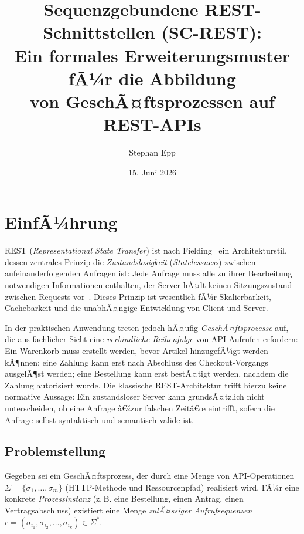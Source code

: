 ﻿\documentclass[a4paper,12pt]{article}
\title{Sequenzgebundene REST-Schnittstellen (SC-REST):\\
Ein formales Erweiterungsmuster fÃ¼r die Abbildung\\
von GeschÃ¤ftsprozessen auf REST-APIs}
\author{Stephan Epp}
\date{15. Juni 2026}
\theoremstyle{definition}
\begin{document}
\maketitle

\tableofcontents
\newpage

\section{EinfÃ¼hrung}

REST (\emph{Representational State Transfer}) ist nach Fielding~\cite{fielding2000} ein
Architekturstil, dessen zentrales Prinzip die \emph{Zustandslosigkeit} (\emph{Statelessness})
zwischen aufeinanderfolgenden Anfragen ist: Jede Anfrage muss alle zu ihrer Bearbeitung
notwendigen Informationen enthalten, der Server hÃ¤lt keinen Sitzungszustand zwischen
Requests vor~\cite{rfc7231}. Dieses Prinzip ist wesentlich fÃ¼r Skalierbarkeit, Cachebarkeit
und die unabhÃ¤ngige Entwicklung von Client und Server.

In der praktischen Anwendung treten jedoch hÃ¤ufig \emph{GeschÃ¤ftsprozesse} auf, die aus
fachlicher Sicht eine \emph{verbindliche Reihenfolge} von API-Aufrufen erfordern: Ein
Warenkorb muss erstellt werden, bevor Artikel hinzugefÃ¼gt werden kÃ¶nnen; eine Zahlung kann
erst nach Abschluss des Checkout-Vorgangs ausgelÃ¶st werden; eine Bestellung kann erst
bestÃ¤tigt werden, nachdem die Zahlung autorisiert wurde. Die klassische REST-Architektur
trifft hierzu keine normative Aussage: Ein zustandsloser Server kann grundsÃ¤tzlich nicht
unterscheiden, ob eine Anfrage â€žzur falschen Zeitâ€œ eintrifft, sofern die Anfrage selbst
syntaktisch und semantisch valide ist.

\subsection{Problemstellung}

Gegeben sei ein GeschÃ¤ftsprozess, der durch eine Menge von API-Operationen
$\Sigma = \{\sigma_1, \ldots, \sigma_m\}$ (HTTP-Methode und Ressourcenpfad) realisiert wird.
FÃ¼r eine konkrete \emph{Prozessinstanz} (z.\,B. eine Bestellung, einen Antrag, einen
Vertragsabschluss) existiert eine Menge \emph{zulÃ¤ssiger Aufrufsequenzen}
$c = (\sigma_{i_1}, \sigma_{i_2}, \ldots, \sigma_{i_k}) \in \Sigma^*$.
\end{document}
